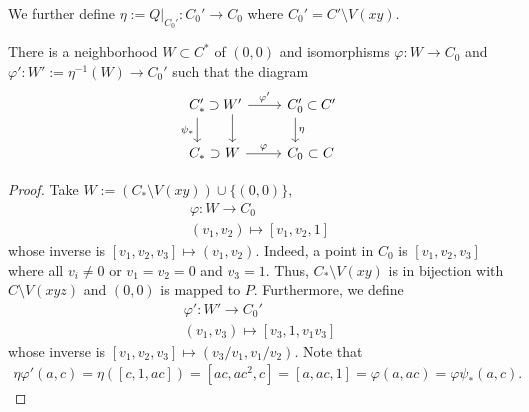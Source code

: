     We further define $\eta := \left. Q\right|_{C_0'} : C_0'\rightarrow C_0$ where $C_0' = C'\setminus V(xy)$.
    \begin{lemma}\label{StandardQuadraticTransformationLocallyLooksLikeAffineBlowUpCase}
        There is a neighborhood $W\subset C^\ast$ of $(0,0)$ and isomorphisms $\varphi: W\rightarrow C_0$ and $\varphi'  : W':= \eta^{-1}(W)\rightarrow C_0'$ such that the diagram
        $$
            \begin{tikzcd}
                C_\ast' \arrow[r, phantom, "\mathrel{\supset}"] \arrow[d, "\psi_\ast"'] &
                [-2em] %
                W' \arrow[r, "\varphi'"] \arrow[d] &
                C_0' \arrow[r, phantom, "\mathrel{\subset}"] \arrow[d,"\eta"] &
                [-2em] %
                C' \\
                C_\ast \arrow[r, phantom, "\mathrel{\supset}"] &
                [-2em]
                W \arrow[r, "\varphi"] &
                C_0 \arrow[r, phantom, "\mathrel{\subset}"] &
                [-2em]
                C
            \end{tikzcd}
        $$
    \end{lemma}
    \begin{proof}
        Take $W:=(C_\ast\setminus V(xy))\cup \{(0,0)\}$, 
        \begin{gather*}
            \varphi : W \rightarrow C_0\\
            (v_1,v_2)\mapsto [v_1,v_2,1]
        \end{gather*}
        whose inverse is $[v_1,v_2,v_3]\mapsto (v_1,v_2)$. Indeed, a point in $C_0$ is $[v_1,v_2,v_3]$ where all $v_i\neq 0$ or $v_1=v_2=0$ and $v_3=1$. Thus, $C_\ast\setminus V(xy)$ is in bijection with $C\setminus V(xyz)$ and $(0,0)$ is mapped to $P$. Furthermore, we define
        \begin{gather*}
            \varphi' : W' \rightarrow C_0'\\
            (v_1,v_3)\mapsto [v_3,1,v_1v_3]
        \end{gather*}
        whose inverse is $[v_1,v_2,v_3]\mapsto (v_3/v_1,v_1/v_2)$. Note that 
        \begin{align*}
            \eta\varphi'(a,c)=\eta([c,1,ac])=[ac,ac^2,c]=[a,ac,1]=\varphi(a,ac)=\varphi\psi_\ast(a,c).
        \end{align*}
    \end{proof}
